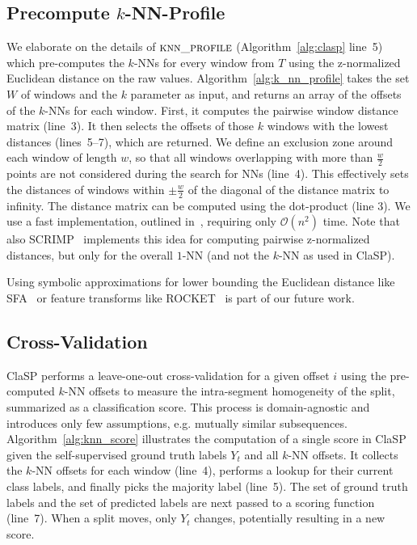 \documentclass[pdflatex,sn-basic]{sn-jnl}
\begin{document}
\subsection{Precompute $k$-NN-Profile} \label{sec:k-nn}

We elaborate on the details of $\textsc{knn\_profile}$ (Algorithm~\ref{alg:clasp} line~5) which pre-computes the $k$-NNs for every window from $T$ using the z-normalized Euclidean distance on the raw values. Algorithm~\ref{alg:k_nn_profile} takes the set $W$ of windows and the $k$ parameter as input, and returns an array of the offsets of the $k$-NNs for each window. First, it computes the pairwise window distance matrix (line~3). It then selects the offsets of those $k$ windows with the lowest distances (lines~5--7), which are returned. We define an exclusion zone around each window of length $w$, so that all windows overlapping with more than $\frac{w}{2}$ points are not considered during the search for NNs (line~4). This effectively sets the distances of windows within $\pm \frac{w}{2}$ of the diagonal of the distance matrix to infinity.
The distance matrix can be computed using the dot-product (line 3). We use a fast implementation, outlined in~\citep{dokmanic2015euclidean, zhu2018matrix}, requiring only $\mathcal{O}(n^2)$ time. Note that also SCRIMP~\citep{zhu2018matrix} implements this idea for computing pairwise z-normalized distances, but only for the overall $1$-NN (and not the $k$-NN as used in ClaSP).

Using symbolic approximations for lower bounding the Euclidean distance like SFA~\citep{SchaferH12} or feature transforms like ROCKET~\citep{dempster2020rocket} is part of our future work.


\subsection{Cross-Validation} \label{sec:crossval}

ClaSP performs a leave-one-out cross-validation for a given offset $i$ using the pre-computed $k$-NN offsets to measure the intra-segment homogeneity of the split, summarized as a classification score. This process is domain-agnostic and introduces only few assumptions, e.g. mutually similar subsequences. Algorithm~\ref{alg:knn_score} illustrates the computation of a single score in ClaSP given the self-supervised ground truth labels $Y_t$ and all $k$-NN offsets. It collects the $k$-NN offsets for each window (line~4), performs a lookup for their current class labels, and finally picks the majority label (line~5). The set of ground truth labels and the set of predicted labels are next passed to a scoring function (line~7). When a split moves, only $Y_t$ changes, potentially resulting in a new score.
\end{document}
